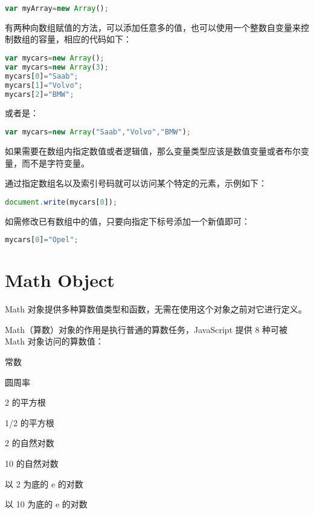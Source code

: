 \begin{lstlisting}[language=JavaScript]
var myArray=new Array();
\end{lstlisting}


有两种向数组赋值的方法，可以添加任意多的值，也可以使用一个整数自变量来控制数组的容量，相应的代码如下：


\begin{lstlisting}[language=JavaScript]
var mycars=new Array();
var mycars=new Array(3);
mycars[0]="Saab";
mycars[1]="Volvo";
mycars[2]="BMW";
\end{lstlisting}


或者是：


\begin{lstlisting}[language=JavaScript]
var mycars=new Array("Saab","Volvo","BMW");
\end{lstlisting}

如果需要在数组内指定数值或者逻辑值，那么变量类型应该是数值变量或者布尔变量，而不是字符变量。

通过指定数组名以及索引号码就可以访问某个特定的元素，示例如下：

\begin{lstlisting}[language=JavaScript]
document.write(mycars[0]);
\end{lstlisting}

如需修改已有数组中的值，只要向指定下标号添加一个新值即可：


\begin{lstlisting}[language=JavaScript]
mycars[0]="Opel";
\end{lstlisting}




\section{Math Object}

Math 对象提供多种算数值类型和函数，无需在使用这个对象之前对它进行定义。

Math（算数）对象的作用是执行普通的算数任务，JavaScript 提供 8 种可被 Math 对象访问的算数值：

\begin{compactitem}
\item 常数
\item 圆周率
\item 2 的平方根
\item 1/2 的平方根
\item 2 的自然对数
\item 10 的自然对数
\item 以 2 为底的 e 的对数
\item 以 10 为底的 e 的对数
\end{compactitem}

